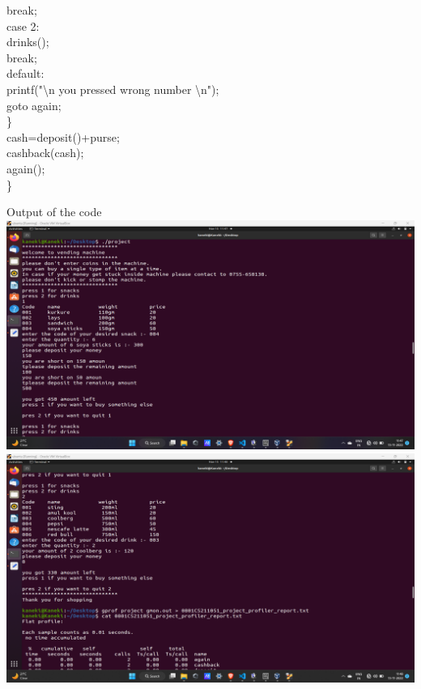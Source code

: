 \documentclass[10pt,a4paper]{article}
\begin{document}
\begin{flushleft}
    \hspace*{0.5cm}  \hspace*{0.5cm}    break;\\
    \hspace*{0.5cm}  case 2:\\
    \hspace*{0.5cm}  \hspace*{0.5cm}   drinks();\\
    \hspace*{0.5cm}  \hspace*{0.5cm}   break;\\
    \hspace*{0.5cm}  default:\\
    \hspace*{0.5cm}  \hspace*{0.5cm}    printf("\textbackslash n you pressed wrong number \textbackslash n");\\
    \hspace*{0.5cm}  \hspace*{0.5cm}   goto again;\\
    \hspace*{0.5cm}  \}\\
    \hspace*{0.5cm}  cash=deposit()+purse;\\
    \hspace*{0.5cm}  cashback(cash);\\
    \hspace*{0.5cm}  again();\\
\}
\newpage
\begin{center}
Output of the code\\
\bigskip
\includegraphics[scale=0.3]{code output1}\\
\bigskip
\includegraphics[scale=0.3]{code output2}

\end{center}
\end{flushleft}
\end{document}
